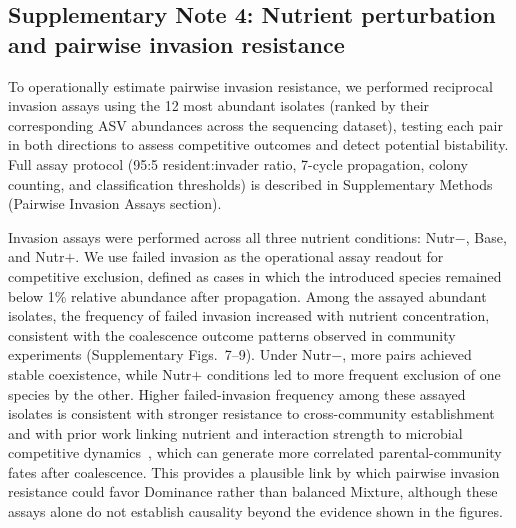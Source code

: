 \subsection*{Supplementary Note 4: Nutrient perturbation and pairwise invasion resistance}
\label{sec:suppl:note4}

To operationally estimate pairwise invasion resistance, we performed reciprocal invasion assays using the 12 most abundant isolates (ranked by their corresponding ASV abundances across the sequencing dataset), testing each pair in both directions to assess competitive outcomes and detect potential bistability. Full assay protocol (95:5 resident:invader ratio, 7-cycle propagation, colony counting, and classification thresholds) is described in Supplementary Methods (Pairwise Invasion Assays section).

Invasion assays were performed across all three nutrient conditions: Nutr$-$, Base, and Nutr$+$. We use failed invasion as the operational assay readout for competitive exclusion, defined as cases in which the introduced species remained below 1\% relative abundance after propagation. Among the assayed abundant isolates, the frequency of failed invasion increased with nutrient concentration, consistent with the coalescence outcome patterns observed in community experiments (Supplementary Figs.~7--9). Under Nutr$-$, more pairs achieved stable coexistence, while Nutr$+$ conditions led to more frequent exclusion of one species by the other. Higher failed-invasion frequency among these assayed isolates is consistent with stronger resistance to cross-community establishment~\citep{Hu2025,Kurkjian2021} and with prior work linking nutrient and interaction strength to microbial competitive dynamics~\citep{Hu2022,Ratzke2020}, which can generate more correlated parental-community fates after coalescence. This provides a plausible link by which pairwise invasion resistance could favor Dominance rather than balanced Mixture, although these assays alone do not establish causality beyond the evidence shown in the figures.
